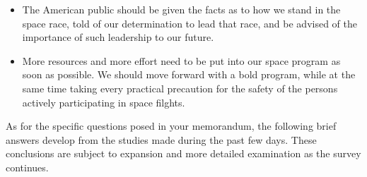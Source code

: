 \documentclass[letterpaper,11pt]{texMemo}
\begin{document}
\begin{itemize}
 \item The American public should be given the facts as to how we stand in the space race, told of our determination to lead that race, and be advised of the importance of such leadership to our future.
 \item More resources and more effort need to be put into our space program as soon as possible.  We should move forward with a bold program, while at the same time taking every practical precaution for the safety of the persons actively participating in space filghts.
\end{itemize}

As for the specific questions posed in your memorandum, the following brief answers develop from the studies made during the past few days.  These conclusions are subject to expansion and more detailed examination as the survey continues.
\end{document}
